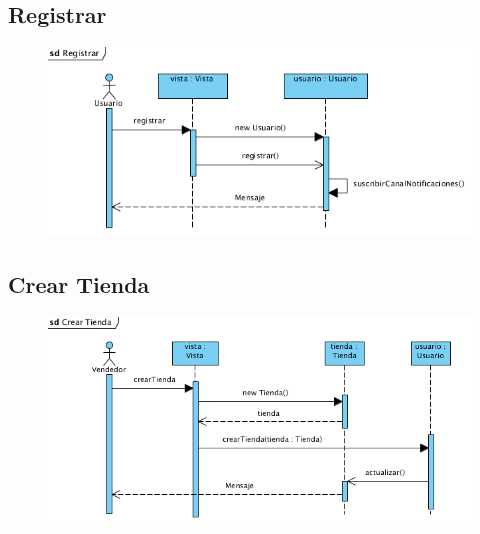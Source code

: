 \subsection{Registrar}
\begin{figure}[H]
  \centering
    \includegraphics{imagenes/disenio/secuencia-registrar.png}
    \label{fig:diagrama-secuencia-registrar}
\end{figure}

\subsection{Crear Tienda}
\begin{figure}[H]
  \centering
    \includegraphics{imagenes/disenio/secuencia-crear-tienda.png}
    \label{fig:diagrama-secuencia-crear-tienda}
\end{figure}


